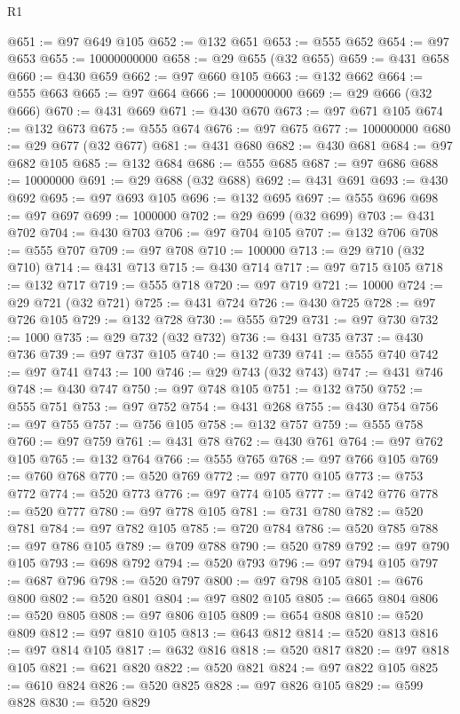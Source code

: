 \begin{lexlean}{R1}
\begin{coremodule}
{{{{{{{{{{{{{{{{{{{{{{{{{{{{{{{{{{{{{{{{{{{{{{{{{{{{{{{{{{{{{{{{{{{{{{{{{{{{{{{{{{{{{{{{{{{{{{{{{{{{{{{{{{{{{{{{{{{{{{{{{{{{{{{{{{{{{{{{{{{{{{{{{{{{{{{{{{{{{{{{{{{{{{{{{{{{{{{{{{{{{{{{{{@651 := @97 @649 @105
@652 := @132 @651
@653 := @555 @652
@654 := @97 @653
@655 := 10000000000
@658 := @29 @655 (@32 @655)
@659 := @431 @658
@660 := @430 @659
@662 := @97 @660 @105
@663 := @132 @662
@664 := @555 @663
@665 := @97 @664
@666 := 1000000000
@669 := @29 @666 (@32 @666)
@670 := @431 @669
@671 := @430 @670
@673 := @97 @671 @105
@674 := @132 @673
@675 := @555 @674
@676 := @97 @675
@677 := 100000000
@680 := @29 @677 (@32 @677)
@681 := @431 @680
@682 := @430 @681
@684 := @97 @682 @105
@685 := @132 @684
@686 := @555 @685
@687 := @97 @686
@688 := 10000000
@691 := @29 @688 (@32 @688)
@692 := @431 @691
@693 := @430 @692
@695 := @97 @693 @105
@696 := @132 @695
@697 := @555 @696
@698 := @97 @697
@699 := 1000000
@702 := @29 @699 (@32 @699)
@703 := @431 @702
@704 := @430 @703
@706 := @97 @704 @105
@707 := @132 @706
@708 := @555 @707
@709 := @97 @708
@710 := 100000
@713 := @29 @710 (@32 @710)
@714 := @431 @713
@715 := @430 @714
@717 := @97 @715 @105
@718 := @132 @717
@719 := @555 @718
@720 := @97 @719
@721 := 10000
@724 := @29 @721 (@32 @721)
@725 := @431 @724
@726 := @430 @725
@728 := @97 @726 @105
@729 := @132 @728
@730 := @555 @729
@731 := @97 @730
@732 := 1000
@735 := @29 @732 (@32 @732)
@736 := @431 @735
@737 := @430 @736
@739 := @97 @737 @105
@740 := @132 @739
@741 := @555 @740
@742 := @97 @741
@743 := 100
@746 := @29 @743 (@32 @743)
@747 := @431 @746
@748 := @430 @747
@750 := @97 @748 @105
@751 := @132 @750
@752 := @555 @751
@753 := @97 @752
@754 := @431 @268
@755 := @430 @754
@756 := @97 @755
@757 := @756 @105
@758 := @132 @757
@759 := @555 @758
@760 := @97 @759
@761 := @431 @78
@762 := @430 @761
@764 := @97 @762 @105
@765 := @132 @764
@766 := @555 @765
@768 := @97 @766 @105
@769 := @760 @768
@770 := @520 @769
@772 := @97 @770 @105
@773 := @753 @772
@774 := @520 @773
@776 := @97 @774 @105
@777 := @742 @776
@778 := @520 @777
@780 := @97 @778 @105
@781 := @731 @780
@782 := @520 @781
@784 := @97 @782 @105
@785 := @720 @784
@786 := @520 @785
@788 := @97 @786 @105
@789 := @709 @788
@790 := @520 @789
@792 := @97 @790 @105
@793 := @698 @792
@794 := @520 @793
@796 := @97 @794 @105
@797 := @687 @796
@798 := @520 @797
@800 := @97 @798 @105
@801 := @676 @800
@802 := @520 @801
@804 := @97 @802 @105
@805 := @665 @804
@806 := @520 @805
@808 := @97 @806 @105
@809 := @654 @808
@810 := @520 @809
@812 := @97 @810 @105
@813 := @643 @812
@814 := @520 @813
@816 := @97 @814 @105
@817 := @632 @816
@818 := @520 @817
@820 := @97 @818 @105
@821 := @621 @820
@822 := @520 @821
@824 := @97 @822 @105
@825 := @610 @824
@826 := @520 @825
@828 := @97 @826 @105
@829 := @599 @828
@830 := @520 @829
}}}}}}}}}}}}}}}}}}}}}}}}}}}}}}}}}}}}}}}}}}}}}}}}}}}}}}}}}}}}}}}}}}}}}}}}}}}}}}}}}}}}}}}}}}}}}}}}}}}}}}}}}}}}}}}}}}}}}}}}}}}}}}}}}}}}}}}}}}}}}}}}}}}}}}}}}}}}}}}}}}}}}}}}}}}}}}}}}}}}}}}}}}
\end{coremodule}
\end{lexlean}
